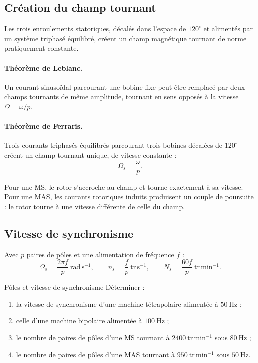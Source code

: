 
\subsection{Création du champ tournant}

Les trois enroulements statoriques, décalés dans l'espace de $120^\circ$ et alimentés par un système triphasé équilibré, créent un champ magnétique tournant de norme pratiquement constante.

\begin{center}\TLChampTournant\end{center}

\paragraph{Théorème de Leblanc.}
Un courant sinusoïdal parcourant une bobine fixe peut être remplacé par deux champs tournants de même amplitude, tournant en sens opposés à la vitesse $\Omega=\omega/p$.

\paragraph{Théorème de Ferraris.}
Trois courants triphasés équilibrés parcourant trois bobines décalées de $120^\circ$ créent un champ tournant unique, de vitesse constante :
\[
\boxed{\Omega_s=\frac{\omega}{p}.}
\]

Pour une MS, le rotor s'accroche au champ et tourne exactement à sa vitesse. Pour une MAS, les courants rotoriques induits produisent un couple de poursuite : le rotor tourne à une vitesse différente de celle du champ.


\subsection{Vitesse de synchronisme}

Avec $p$ paires de pôles et une alimentation de fréquence $f$ :
\[
\boxed{\Omega_s=\frac{2\pi f}{p}\ \mathrm{rad\,s^{-1}},}
\qquad
\boxed{n_s=\frac{f}{p}\ \mathrm{tr\,s^{-1}},}
\qquad
\boxed{N_s=\frac{60f}{p}\ \mathrm{tr\,min^{-1}}.}
\]

\begin{TLMachineExercise}{Pôles et vitesse de synchronisme}
Déterminer :
\begin{enumerate}
  \item la vitesse de synchronisme d'une machine tétrapolaire alimentée à $50\ \mathrm{Hz}$ ;
  \item celle d'une machine bipolaire alimentée à $100\ \mathrm{Hz}$ ;
  \item le nombre de paires de pôles d'une MS tournant à $2400\ \mathrm{tr\,min^{-1}}$ sous $80\ \mathrm{Hz}$ ;
  \item le nombre de paires de pôles d'une MAS tournant à $950\ \mathrm{tr\,min^{-1}}$ sous $50\ \mathrm{Hz}$.
\end{enumerate}
\end{TLMachineExercise}

